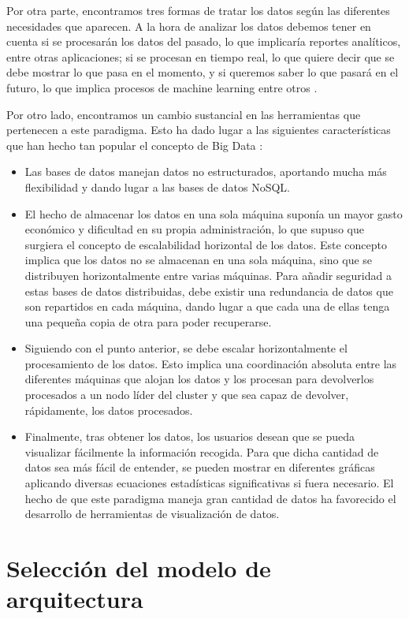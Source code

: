Por otra parte, encontramos tres formas de tratar los datos según las
diferentes necesidades que aparecen. A la hora de analizar los datos
debemos tener en cuenta si se procesarán los datos del pasado, lo que
implicaría reportes analíticos, entre otras aplicaciones; si se procesan en
tiempo real, lo que quiere decir que se debe mostrar lo que pasa en el
momento, y si queremos saber lo que pasará en el futuro, lo que implica
procesos de machine learning entre otros \cite{BD-3}.

Por otro lado, encontramos un cambio sustancial en las herramientas que
pertenecen a este paradigma. Esto ha dado lugar a las siguientes
características que han hecho tan popular el concepto de Big Data
\cite{BD-6}:

\begin{itemize}
\item Las bases de datos manejan datos no estructurados, aportando mucha
  más flexibilidad y dando lugar a las bases de datos NoSQL.
\item El hecho de almacenar los datos en una sola máquina suponía un mayor
  gasto económico y dificultad en su propia administración, lo que supuso
  que surgiera el concepto de escalabilidad horizontal de los datos. Este
  concepto implica que los datos no se almacenan en una sola máquina, sino
  que se distribuyen horizontalmente entre varias máquinas. Para añadir
  seguridad a estas bases de datos distribuidas, debe existir una
  redundancia de datos que son repartidos en cada máquina, dando lugar a
  que cada una de ellas tenga una pequeña copia de otra para poder
  recuperarse.
\item Siguiendo con el punto anterior, se debe escalar horizontalmente el
  procesamiento de los datos. Esto implica una coordinación absoluta entre
  las diferentes máquinas que alojan los datos y los procesan para
  devolverlos procesados a un nodo líder del cluster y que sea capaz de
  devolver, rápidamente, los datos procesados.
\item Finalmente, tras obtener los datos, los usuarios desean que se pueda
  visualizar fácilmente la información recogida. Para que dicha cantidad de
  datos sea más fácil de entender, se pueden mostrar en diferentes
  gráficas aplicando diversas ecuaciones estadísticas significativas si
  fuera necesario. El hecho de que este paradigma maneja gran cantidad de
  datos ha favorecido el desarrollo de herramientas de visualización de
  datos.
\end{itemize}


\section{Selección del modelo de arquitectura\label{arqSelect}}


